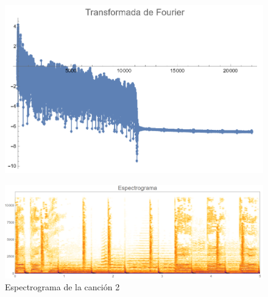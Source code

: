 \documentclass[12pt, letterpaper]{article}
\begin{document}
\begin{figure}[H]
  \centering
  \begin{minipage}{.4\linewidth}
    \centering
    \includegraphics[width=\linewidth]{imgs/Cancion2/transformada.png}
    \label{fig:02a}
  \end{minipage}
  \begin{minipage}{0.07\textwidth}\end{minipage}
  \begin{minipage}{.47\linewidth}
    \centering
    \includegraphics[width=\linewidth]{imgs/Cancion2/espectrograma.png}
    \caption{Espectrograma de la canción 2}
    \label{fig:02i}
  \end{minipage}
\end{figure}
\end{document}

